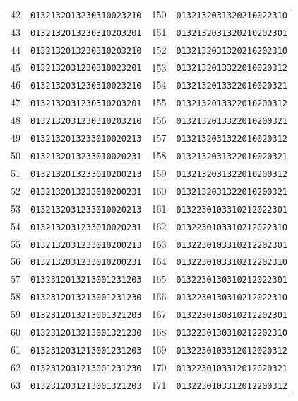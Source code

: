 \documentclass[aps,pra,reprint,superscriptaddress,longbibliography,nofootinbib,floatfix,10pt]{revtex4-2}
\theoremstyle{definition}
\begin{document}
\begin{longtable}{rl@{\qquad}rl}
42 & \texttt{0132132013230310023210} & 150 & \texttt{0132132031320210022310}\\
43 & \texttt{0132132013230310203201} & 151 & \texttt{0132132031320210202301}\\
44 & \texttt{0132132013230310203210} & 152 & \texttt{0132132031320210202310}\\
45 & \texttt{0132132031230310023201} & 153 & \texttt{0132132013322010020312}\\
46 & \texttt{0132132031230310023210} & 154 & \texttt{0132132013322010020321}\\
47 & \texttt{0132132031230310203201} & 155 & \texttt{0132132013322010200312}\\
48 & \texttt{0132132031230310203210} & 156 & \texttt{0132132013322010200321}\\
49 & \texttt{0132132013233010020213} & 157 & \texttt{0132132031322010020312}\\
50 & \texttt{0132132013233010020231} & 158 & \texttt{0132132031322010020321}\\
51 & \texttt{0132132013233010200213} & 159 & \texttt{0132132031322010200312}\\
52 & \texttt{0132132013233010200231} & 160 & \texttt{0132132031322010200321}\\
53 & \texttt{0132132031233010020213} & 161 & \texttt{0132230103310212022301}\\
54 & \texttt{0132132031233010020231} & 162 & \texttt{0132230103310212022310}\\
55 & \texttt{0132132031233010200213} & 163 & \texttt{0132230103310212202301}\\
56 & \texttt{0132132031233010200231} & 164 & \texttt{0132230103310212202310}\\
57 & \texttt{0132312013213001231203} & 165 & \texttt{0132230130310212022301}\\
58 & \texttt{0132312013213001231230} & 166 & \texttt{0132230130310212022310}\\
59 & \texttt{0132312013213001321203} & 167 & \texttt{0132230130310212202301}\\
60 & \texttt{0132312013213001321230} & 168 & \texttt{0132230130310212202310}\\
61 & \texttt{0132312031213001231203} & 169 & \texttt{0132230103312012020312}\\
62 & \texttt{0132312031213001231230} & 170 & \texttt{0132230103312012020321}\\
63 & \texttt{0132312031213001321203} & 171 & \texttt{0132230103312012200312}\\

\end{longtable}
\end{document}
